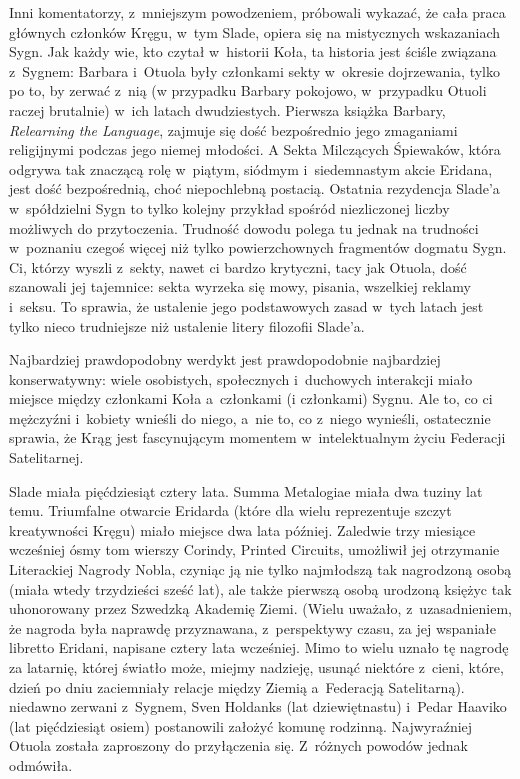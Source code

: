 \documentclass[oneside,polish,11pt,rmheadings]{mwbk}
\begin{document}
Inni komentatorzy, z~mniejszym powodzeniem, próbowali wykazać, że cała praca głównych członków Kręgu, w~tym Slade, opiera się na mistycznych wskazaniach Sygn. Jak każdy wie, kto czytał w~historii Koła, ta historia jest ściśle związana z~Sygnem: Barbara i~Otuola były członkami sekty w~okresie dojrzewania, tylko po to, by zerwać z~nią (w przypadku Barbary pokojowo, w~przypadku Otuoli raczej brutalnie) w~ich latach dwudziestych. Pierwsza książka Barbary, \textit{Relearning the Language}, zajmuje się dość bezpośrednio jego zmaganiami religijnymi podczas jego niemej młodości. A Sekta Milczących Śpiewaków, która odgrywa tak znaczącą rolę w~piątym, siódmym i~siedemnastym akcie Eridana, jest dość bezpośrednią, choć niepochlebną postacią. Ostatnia rezydencja Slade'a w~spółdzielni Sygn to tylko kolejny przykład spośród niezliczonej liczby możliwych do przytoczenia. Trudność dowodu polega tu jednak na trudności w~poznaniu czegoś więcej niż tylko powierzchownych fragmentów dogmatu Sygn.  Ci, którzy wyszli z~sekty, nawet ci bardzo krytyczni, tacy jak Otuola, dość szanowali jej tajemnice: sekta wyrzeka się mowy, pisania, wszelkiej reklamy i~seksu. To sprawia, że ustalenie jego podstawowych zasad w~tych latach jest tylko nieco trudniejsze niż ustalenie litery filozofii Slade'a. 

Najbardziej prawdopodobny werdykt jest prawdopodobnie najbardziej konserwatywny: wiele osobistych, społecznych i~duchowych interakcji miało miejsce między członkami Koła a~członkami (i członkami) Sygnu. Ale to, co ci mężczyźni i~kobiety wnieśli do niego, a~nie to, co z~niego wynieśli, ostatecznie sprawia, że Krąg jest fascynującym momentem w~intelektualnym życiu Federacji Satelitarnej.

Slade miała pięćdziesiąt cztery lata. Summa Metalogiae miała dwa tuziny lat temu. Triumfalne otwarcie Eridarda (które dla wielu reprezentuje szczyt kreatywności Kręgu) miało miejsce dwa lata później. Zaledwie trzy miesiące wcześniej ósmy tom wierszy Corindy, Printed Circuits, umożliwił jej otrzymanie Literackiej Nagrody Nobla, czyniąc ją nie tylko najmłodszą tak nagrodzoną osobą (miała wtedy trzydzieści sześć lat), ale także pierwszą osobą urodzoną księżyc tak uhonorowany przez Szwedzką Akademię Ziemi. (Wielu uważało, z~uzasadnieniem, że nagroda była naprawdę przyznawana, z~perspektywy czasu, za jej wspaniałe libretto Eridani, napisane cztery lata wcześniej. Mimo to wielu uznało tę nagrodę za latarnię, której światło może, miejmy nadzieję, usunąć niektóre z~cieni, które, dzień po dniu zaciemniały relacje między Ziemią a~Federacją Satelitarną). niedawno zerwani z~Sygnem, Sven Holdanks (lat dziewiętnastu) i~Pedar Haaviko (lat pięćdziesiąt osiem) postanowili założyć komunę rodzinną. Najwyraźniej Otuola została zaproszony do przyłączenia się. Z~różnych powodów jednak odmówiła. 
\end{document}
